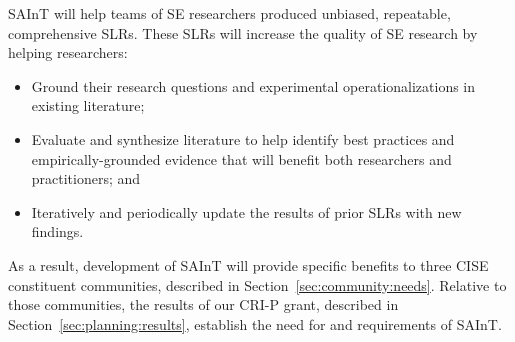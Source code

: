 
SAInT will help teams of SE researchers produced unbiased, repeatable, comprehensive SLRs.
These SLRs will increase the quality of SE research by helping researchers:
\vspace{-8pt}
\begin{itemize}
	\item Ground their research questions and experimental operationalizations in existing literature;
	\vspace{-8pt}
	\item Evaluate and synthesize literature to help identify best practices and empirically-grounded evidence that will benefit both researchers and practitioners; and
	\vspace{-4pt}
	\item Iteratively and periodically update the results of prior SLRs with new findings.
\end{itemize}
\vspace{-8pt}
As a result, development of SAInT will provide specific benefits to three CISE constituent communities, described in Section~\ref{sec:community:needs}.
Relative to those communities, the results of our CRI-P grant, described in Section~\ref{sec:planning:results}, establish the need for and requirements of SAInT.

